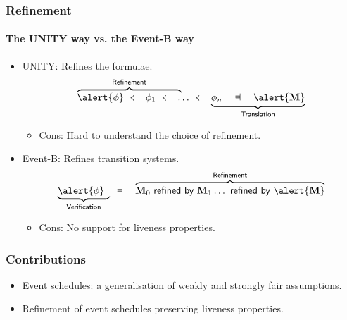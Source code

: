 \begin{frame}
  \frametitle{Refinement}
  \framesubtitle{The UNITY way vs. the Event-B way}


  \begin{itemize}
  \item UNITY: Refines the \alert{formulae}.
    \[
    \lefteqn{\overbrace{\phantom{\phi \wide\follows \phi_1
          \wide\follows \ldots \wide\follows
          \phi_n}}^{\textsf{Refinement}}} \alert{\phi} \wide\follows \phi_1
    \wide\follows \ldots \wide\follows \underbrace{\phi_n \WIDE\dashV
      \alert{\Mch}}_{\textsf{Translation}}
    \]
    \begin{itemize}
    \item<2-> Cons: \alert{Hard to understand} the choice of refinement.
    \end{itemize}
    \medskip

  \item Event-B: Refines \alert{transition systems}.
    \[
    \lefteqn{
      \underbrace{\phantom{\phi \WIDE\dashV
        \Mch_0}}_{\textsf{Verification}}}  \alert{\phi} \WIDE\dashV
        \overbrace{\Mch_0 \wide\abstracts \Mch_1 \ldots \wide\abstracts \alert{\Mch}}^{\textsf{Refinement}}
    \]
    \begin{itemize}
    \item<2-> Cons: No support for \alert{liveness properties}.
    \end{itemize}
  \end{itemize}

\end{frame}

\begin{frame}
  \frametitle{Contributions}

  \begin{itemize}
  \item Event schedules: a generalisation of weakly and strongly fair
    assumptions.
    \medskip
  \item Refinement of event schedules preserving liveness properties.
  \end{itemize}
\end{frame}


